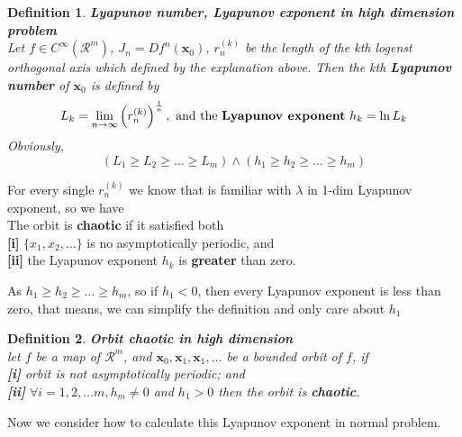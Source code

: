 \documentclass[12pt]{article}
\theoremstyle{plain}
\newtheorem{definition}{{\color{red}\textbf{Definition}}}[section]
\begin{document}
{\color{red}
\begin{definition}\textbf{Lyapunov number, Lyapunov exponent in high dimension problem}
\\\noindent Let $f \in C^\infty(\mathcal R^m)$, $J_n = Df^n(\mathbf x_0)$, $r_n^{(k)}$ be the length of the kth logenst orthogonal axis which defined by the explanation above. Then the kth \textbf{Lyapunov number} of $\mathbf x_0$ is defined by 
$$
L_k = \lim_{n \rightarrow \infty}\left(r_n^{(k)}\right)^{1 \over n} , \text{ and the \textbf{Lyapunov exponent} }h_k = \ln L_k
$$
Obviously, 
$$
\left(L_1 \geq L_2 \geq \ldots \geq L_m\right) \land \left(h_1 \geq h_2 \geq \ldots \geq h_m\right)
$$
\end{definition}
}


For every single $r_n^{(k)}$ we know that is familiar with $\lambda$ in 1-dim Lyapunov exponent, so we have 
\\\noindent The orbit is \textbf{chaotic} if it satisfied both
\\\noindent \textbf{[i]} $\{x_1, x_2, \ldots \}$ is no asymptotically periodic, and
\\\noindent \textbf{[ii]} the Lyapunov exponent $h_k$ is \textbf{greater} than zero.

As $h_1 \geq h_2 \geq \ldots \geq h_m$, so if $h_1 < 0$, then every Lyapunov exponent is less than zero, that means, we can simplify the definition and only care about $h_1$

{\color{red}
\begin{definition}\textbf{Orbit chaotic in high dimension}
\\\noindent let $f$ be a map of $\mathcal R^m$, and $\mathbf x_0, \mathbf x_1, \mathbf x_1, \ldots $ be a bounded orbit of $f$, if 
\\\noindent \textbf{[i]} orbit is not asymptotically periodic; and
\\\noindent \textbf{[ii]} $\forall i = 1, 2, \ldots m, h_m \neq 0$ and $h_1 > 0$
then the orbit is \textbf{chaotic}.
\end{definition} 
}













Now we consider how to calculate this Lyapunov exponent in normal problem.
\end{document}

